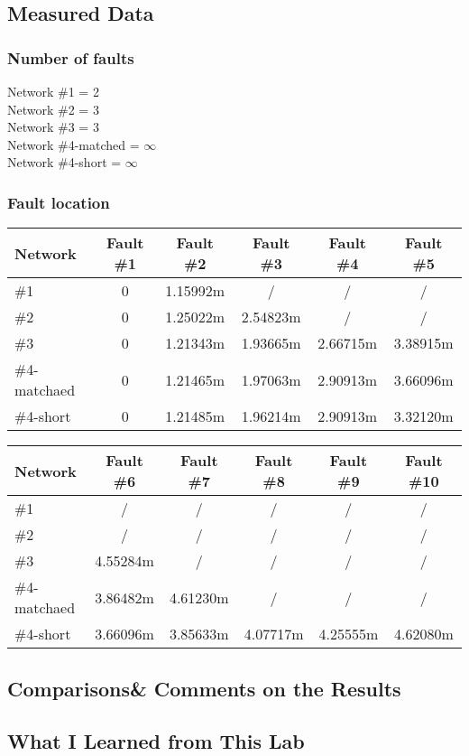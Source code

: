 \documentclass[11pt,oneside,a4paper]{report}
\begin{document}
\subsection*{Measured Data}
\subsubsection*{Number of faults}
Network \#1 = 2\\
Network \#2 = 3\\
Network \#3 = 3\\
Network \#4-matched = \(\infty\)\\
Network \#4-short = \(\infty\)
\subsubsection*{Fault location}
\begin{table}[htbp]
\begin{tabular}{lccccc}
\toprule
Network & Fault \#1 & Fault \#2 & Fault \#3 & Fault \#4 & Fault \#5 \\
\midrule
\#1 & 0 & 1.15992m & / & / & / \\
\#2 & 0 & 1.25022m & 2.54823m & / & / \\
\#3 & 0 & 1.21343m & 1.93665m & 2.66715m & 3.38915m \\
\#4-matchaed & 0 & 1.21465m & 1.97063m & 2.90913m & 3.66096m \\
\#4-short & 0 & 1.21485m & 1.96214m & 2.90913m & 3.32120m \\
\bottomrule
\end{tabular}
\end{table}

\begin{table}[htbp]
\begin{tabular}{lccccc}
\toprule
Network & Fault \#6 & Fault \#7 & Fault \#8 & Fault \#9 & Fault \#10 \\
\midrule
\#1 & / & / & / & / & / \\
\#2 & / & / & / & / & / \\
\#3 & 4.55284m & / & / & / & / \\
\#4-matchaed & 3.86482m & 4.61230m & / & / & / \\
\#4-short & 3.66096m & 3.85633m & 4.07717m & 4.25555m & 4.62080m \\
\bottomrule
\end{tabular}
\end{table}

\subsection*{Comparisons\& Comments on the Results}

\subsection*{What I Learned from This Lab}
\end{document}
